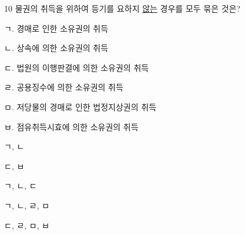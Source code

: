 \begin{question}{10}
물권의 취득을 위하여 등기를 요하지 \uline{않는} 경우를 모두 묶은 것은?
\begin{framedtext}
ㄱ. 경매로 인한 소유권의 취득 \par
ㄴ. 상속에 의한 소유권의 취득 \par
ㄷ. 법원의 이행판결에 의한 소유권의 취득 \par
ㄹ. 공용징수에 의한 소유권의 취득 \par
ㅁ. 저당물의 경매로 인한 법정지상권의 취득 \par
ㅂ. 점유취득시효에 의한 소유권의 취득 \par
\end{framedtext}
\begin{choices}
  \item ㄱ, ㄴ
  \item ㄷ, ㅂ
  \item ㄱ, ㄴ, ㄷ
  \item ㄱ, ㄴ, ㄹ, ㅁ
  \item ㄷ, ㄹ, ㅁ, ㅂ
\end{choices}
\end{question}
